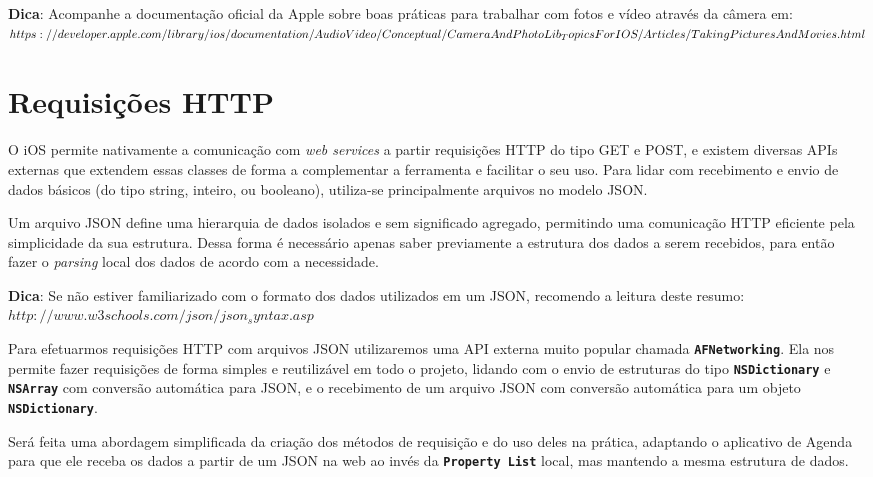 \documentclass[a4paper,12pt,brazil,doubleside]{book}
\begin{document}
\begin{singlespace}
\begin{framed}

\textbf{Dica}: Acompanhe a documentação oficial da Apple sobre boas práticas para trabalhar com fotos e vídeo através da câmera em:\\
\(https://developer.apple.com/library/ios/documentation/AudioVideo/Conceptual/\\CameraAndPhotoLib_TopicsForIOS/Articles/TakingPicturesAndMovies.html\)
\end{framed}


\section{Requisições HTTP}


O iOS permite nativamente a comunicação com \emph{web services} a partir requisições HTTP do tipo GET e POST, e existem diversas APIs externas que extendem essas classes de forma a complementar a ferramenta e facilitar o seu uso. Para lidar com recebimento e envio de dados básicos (do tipo string, inteiro, ou booleano), utiliza-se principalmente arquivos no modelo JSON.

Um arquivo JSON define uma hierarquia de dados isolados e sem significado agregado, permitindo uma comunicação HTTP eficiente pela simplicidade da sua estrutura. Dessa forma é necessário apenas saber previamente a estrutura dos dados a serem recebidos, para então fazer o \emph{parsing} local dos dados de acordo com a necessidade.

\begin{framed}

\textbf{Dica}:  Se não estiver familiarizado com o formato dos dados utilizados em um JSON, recomendo a leitura deste resumo:\\
\(http://www.w3schools.com/json/json_syntax.asp\)

\end{framed}



Para efetuarmos requisições HTTP com arquivos JSON utilizaremos uma API externa muito popular chamada \texttt{\textbf{AFNetworking}}. Ela nos permite fazer requisições de forma simples e reutilizável em todo o projeto, lidando com o envio de estruturas do tipo \texttt{\textbf{NSDictionary}} e \texttt{\textbf{NSArray}} com conversão automática para JSON, e o recebimento de um arquivo JSON com conversão automática para um objeto \texttt{\textbf{NSDictionary}}.

Será feita uma abordagem simplificada da criação dos métodos de requisição e do uso deles na prática, adaptando o aplicativo de Agenda para que ele receba os dados a partir de um JSON na web ao invés da \texttt{\textbf{Property List}} local, mas mantendo a mesma estrutura de dados.


\end{singlespace}
\end{document}
